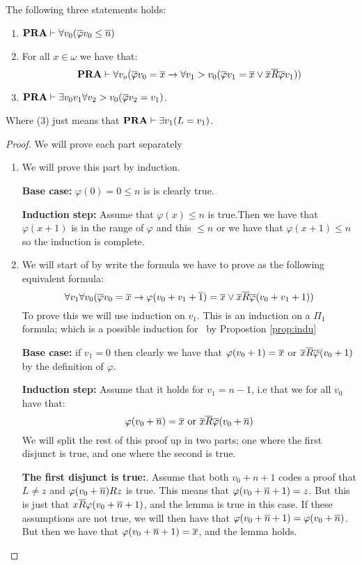\documentclass[../main.tex]{subfiles}
\begin{document}
\begin{lem}
	\label{lem:2}
	The following three statements holds:
	\begin{enumerate}
		\item $\text{\textbf{PRA}}\vdash\forall v_0(\overline \varphi v_0\leq \overline n)$
		\item For all $x\in\omega$ we have that:\ $$\text{\textbf{PRA}}\vdash\forall
			v_o(\overline
			\varphi v_0=\overline x\rightarrow\forall v_1>v_0(\overline \varphi v_1=\overline x\vee
			\overline x\overline R\overline \varphi v_1))$$
		\item $\text{\textbf{PRA}}\vdash\exists v_0v_1\forall v_2>v_0(\overline \varphi v_2=v_1)$. 
	\end{enumerate}
	Where (3) just means that $\text{\textbf{PRA}}\vdash\exists v_1(L=v_1)$.
\end{lem}
\begin{proof}

	We will prove each part separately 

	\begin{enumerate}

		\item We will prove this part by induction.

			\textbf{Base case:} $\varphi(0)=0\leq n$ is is clearly true.

			\textbf{Induction step:} Assume that $\varphi(x)\leq n$ is
			true.Then we have that $\varphi(x+1)$ is in the range
			of $\varphi$
			and this $\leq n$ or we have that $\varphi(x+1)\leq n$ so the
			induction is complete.
		\item We will start of by write the formula we have to prove as
			the following equivalent formula:
			$$\forall v_1\forall v_0(\overline{\varphi}v_0=\overline x\rightarrow
			\varphi(v_0 + v_1+\overline 1)=\overline x\vee \overline x\overline R\overline
			\varphi(v_0+v_1+1))$$
			To prove this we will use induction on $v_1$. This is
			an induction on a $\Pi_1$ formula; which is a possible
			induction for \PRA\ by Propostion \ref{prop:indu}

			\textbf{Base case:} if $v_1=0$ then clearly we have that
			$\varphi(v_0+1)=\overline x$ or $\overline x\overline R\overline
			\varphi(v_0+1)$ by the definition of $\varphi$.

			\textbf{Induction step:} Assume that it holds for
			$v_1=n-1$, i.e that we for all $v_0$ have that:
			\[\varphi(v_0+\ol n)=\ol x\ \text{or}\ \ol x\ol
			R\ol\varphi(v_0+\ol n)\]
			We will split the rest of this proof up in two parts;
			one where the first disjunct is true, and one where the
			second is true.

			\textbf{The first disjunct is true:}. Assume that both
			$v_0+n+1$ codes a proof that $L\not =z$ and
			$\varphi(v_0+\overline n) Rz$ is true. This means that
			$\varphi(v_0+\overline n+1)=z$. But this is just that $x\overline
			R\varphi(v_0+\overline n+1)$, and the lemma is true in this case.
			If these assumptions are not true, we will then have
			that $\varphi(v_0+\overline n+1)=\varphi(v_0+\overline n)$. But
			then we have that $\varphi(v_0+\overline n+1)=\overline x$, and the
			lemma holds.
			

\end{enumerate}
\end{proof}
\end{document}
